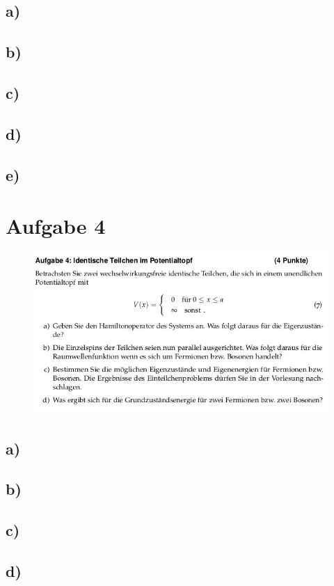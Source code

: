 \subsection{a)}


\subsection{b)}


\subsection{c)}


\subsection{d)}


\subsection{e)}


\section{Aufgabe 4}
\begin{figure}[H]
    \centering
    \includegraphics[width=\textwidth]{images/ex4.jpg}
\end{figure}

\subsection{a)}

\subsection{b)}

\subsection{c)}

\subsection{d)}


